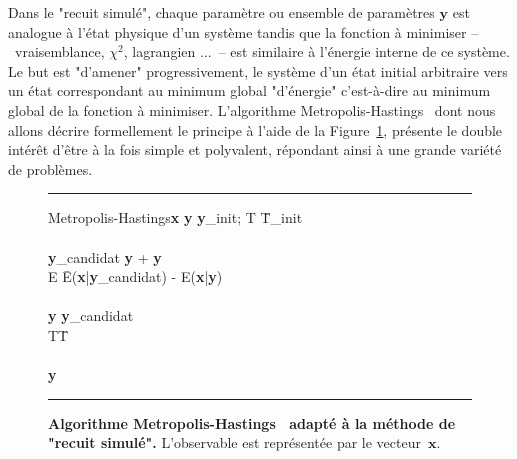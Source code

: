 \documentclass[10pt,a4paper,twoside]{report}
\begin{document}
Dans le "recuit simulé", chaque paramètre ou ensemble de paramètres
$\textbf{y}$ est analogue à l'état physique d'un système tandis que
la fonction à minimiser --~vraisemblance, $\chi^2$, lagrangien ...~--
est similaire à l'énergie interne de ce système. Le but est
"d'amener" progressivement, le système d'un état initial arbitraire
vers un état correspondant au minimum global "d'énergie"
c'est-à-dire au minimum global de la fonction à minimiser. L'algorithme
Metropolis-Hastings~\cite{metro,hastings} dont nous allons décrire
formellement le principe à l'aide de la Figure~\ref{alg:MH}, présente
le double intérêt d'être à la fois simple et polyvalent, répondant ainsi à une
grande variété de problèmes.

\begin{figure}[h]
  {\setlength{\baselineskip}{1.2\baselineskip} \hrule height1.0pt
    \smallskip
    \begin{algorithm}{Metropolis-Hastings}{\textbf{x}}
      \quad\textbf{y} \= \textbf{y}_\textrm{init}\quad; T \= T_\textrm{init}\\
      \quad{}\\
      \quad\qquad\textbf{y}_\textrm{candidat} \= \textbf{y} + \Delta\textbf{y}\\
      \quad\qquad\Delta E \= E(\textbf{x}|\textbf{y}_\textrm{candidat}) - E(\textbf{x}|\textbf{y})\\
      \quad\qquad{}\\
      \quad\qquad\qquad\textbf{y} \= \textbf{y}_\textrm{candidat}\\
      \quad\qquad T\= T\searrow\\
      \quad{}\\
      \quad{} \textbf{y}
    \end{algorithm}
    \vspace{-0.5cm}
    \hrule height1.0pt
    \par}
  \caption{\textbf{\label{alg:MH}Algorithme
      Metropolis-Hastings~\cite{metro,hastings} adapté à la méthode de
      "recuit simulé".} L'observable est représentée par le
    vecteur~$\textbf{x}$.}
\end{figure}
\end{document}
